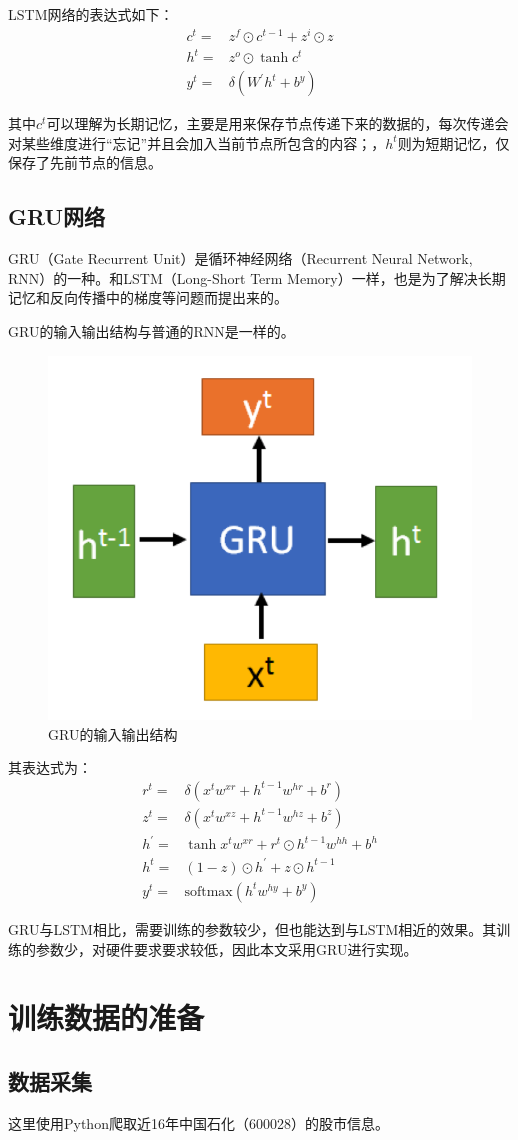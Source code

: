 \documentclass{jnuthesis}
\begin{document}
LSTM网络的表达式如下：
\begin{align}
	 c^t=&z^f\odot c^{t-1}+z^{i}\odot z\\
	 h^{t}=&z^{o}\odot \tanh{c^{t}}\\
	 y^{t}=&\delta(W^{\prime}h^{t}+b^{y})
\end{align}

其中$ c^{t} $可以理解为长期记忆，主要是用来保存节点传递下来的数据的，每次传递会对某些维度进行“忘记”并且会加入当前节点所包含的内容；，$ h^{t} $则为短期记忆，仅保存了先前节点的信息。

\subsection{GRU网络}
GRU（Gate Recurrent Unit）是循环神经网络（Recurrent Neural Network, RNN）的一种。和LSTM（Long-Short Term Memory）一样，也是为了解决长期记忆和反向传播中的梯度等问题而提出来的。

GRU的输入输出结构与普通的RNN是一样的。
\begin{figure}[H]
	\centering
	\includegraphics[width=0.3\linewidth]{pic/screenshot003}
	\caption{GRU的输入输出结构}
	\label{fig:screenshot003}
\end{figure}

其表达式为：
\begin{align}
	r^{t}=&\delta(x^{t}w^{xr}+h^{t-1}w^{hr}+b^{r})\\
	z^{t}=&\delta(x^{t}w^{xz}+h^{t-1}w^{hz}+b^{z})\\
	h^{\prime}=&\tanh{x^{t}w^{xr}+r^{t}\odot h^{t-1}w^{hh}+b^{h} }\\
	h^t=&(1-z)\odot h^{\prime}+z\odot h^{t-1}\\
	y^{t}=&\text{softmax}(h^{t}w^{hy}+b^{y})
\end{align}


GRU与LSTM相比，需要训练的参数较少，但也能达到与LSTM相近的效果。其训练的参数少，对硬件要求要求较低，因此本文采用GRU进行实现。
\section{训练数据的准备}
\subsection{数据采集}
这里使用Python爬取近16年中国石化（600028）的股市信息。
\end{document}
